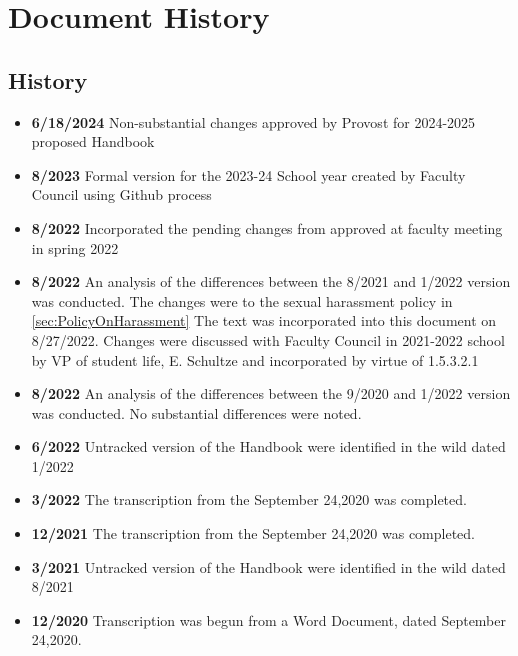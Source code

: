 \section{Document History}
	\subsection{History}
		\begin{itemize}
			\item{{\bfseries 6/18/2024} Non-substantial changes approved by Provost for 2024-2025 proposed Handbook }
			\item{{\bfseries 8/2023} Formal version for the 2023-24 School year created by Faculty Council using Github process }
			\item{{\bfseries 8/2022} Incorporated the pending changes from approved at faculty meeting in spring 2022}
			\item{{\bfseries 8/2022} An analysis of the differences between the 8/2021 and 1/2022 version was conducted.
				The changes were to the sexual harassment policy in
				\ref{sec:PolicyOnHarassment}
				The text was incorporated into this document on 8/27/2022.
				Changes
				were discussed with Faculty Council in 2021-2022 school by VP of student life, E. Schultze and incorporated by virtue of 1.5.3.2.1
			}
			\item{{\bfseries 8/2022} An analysis of the differences between the 9/2020 and 1/2022 version was conducted. No substantial differences were noted.}
			\item{{\bfseries 6/2022} Untracked version of the Handbook were identified in the wild dated 1/2022}
			\item{{\bfseries 3/2022} The transcription from the September 24,2020 was completed.}
			\item{{\bfseries 12/2021} The transcription from the September 24,2020 was completed.}
			\item{{\bfseries 3/2021} Untracked version of the Handbook were identified in the wild dated 8/2021}
			\item{{\bfseries 12/2020} Transcription was begun from a Word Document, dated September 24,2020.}
		\end{itemize}